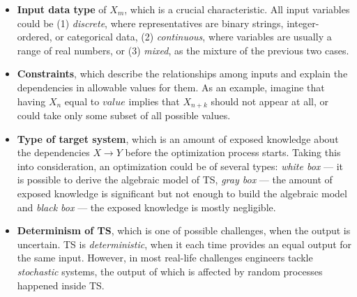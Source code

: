 \begin{itemize}
	\item \textbf{Input data type} of $X_m$, which is a crucial characteristic. All input variables could be (1) \emph{discrete}, where representatives are binary strings, integer-ordered, or categorical data, (2) \emph{continuous}, where variables are usually a range of real numbers, or (3) \emph{mixed}, as the mixture of the previous two cases.

	\item \textbf{Constraints}, which describe the relationships among inputs and explain the dependencies in allowable values for them. As an example, imagine that having $X_n$ equal to $value$ implies that $X_{n + k}$ should not appear at all, or could take only some subset of all possible values.
	
	\item \textbf{Type of target system}, which is an amount of exposed knowledge about the dependencies $X \rightarrow Y$ before the optimization process starts. Taking this into consideration, an optimization could be of several types: \emph{white box} — it is possible to derive the algebraic model of TS, \emph{gray box} — the amount of exposed knowledge is significant but not enough to build the algebraic model and \emph{black box} — the exposed knowledge is mostly negligible.


	\item \textbf{Determinism of TS}, which is one of possible challenges, when the output is uncertain. TS is \emph{deterministic}, when it each time provides an equal output for the same input. However, in most real-life challenges engineers tackle \emph{stochastic} systems, the output of which is affected by random processes happened inside TS.


\end{itemize}
